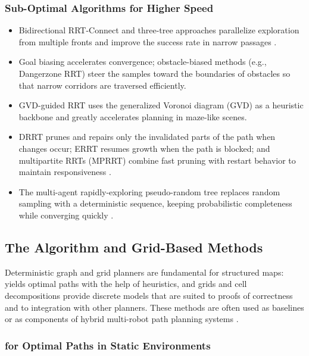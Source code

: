 \subsubsection{Sub-Optimal Algorithms for Higher Speed}

\begin{itemize}
  \item {} Bidirectional RRT-Connect and three-tree
        approaches parallelize exploration from multiple fronts and improve the
        success rate in narrow passages \cite{abujabal2024path,yuan2020bilevel}.
  \item {} Goal biasing accelerates convergence;
        obstacle-biased methods (e.g., Dangerzone RRT) steer the samples toward
        the boundaries of obstacles so that narrow corridors are traversed
        efficiently.
  \item {} GVD-guided RRT uses the generalized
        Voronoi diagram (GVD) as a heuristic backbone and greatly accelerates
        planning in maze-like scenes.
  \item {} DRRT prunes and repairs only the invalidated
        parts of the path when changes occur; ERRT resumes growth when the path
        is blocked; and multipartite RRTs (MPRRT) combine fast pruning with
        restart behavior to maintain responsiveness \cite{chen2025survey}.
  \item {} The multi-agent rapidly-exploring pseudo-random
        tree replaces random sampling with a deterministic sequence, keeping
        probabilistic completeness while converging quickly
        \cite{neto2017multi}.
\end{itemize}

\subsection{The \texorpdfstring{\Astar}{A*} Algorithm and Grid-Based Methods}

Deterministic graph and grid planners are fundamental for structured maps:
\Astar{} yields optimal paths with the help of heuristics, and grids and cell
decompositions provide discrete models that are suited to proofs of correctness
and to integration with other planners. These methods are often used as
baselines or as components of hybrid multi-robot path planning systems
\cite{abujabal2024path,lin2022review}.

\subsubsection{\texorpdfstring{\Astar}{A*} for Optimal Paths in Static Environments}

